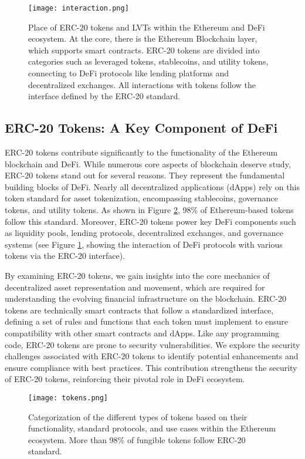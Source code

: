 \begin{figure}[t]
	\centering
	\texttt{[image: interaction.png]}
	\caption{Place of ERC-20 tokens and LVTs within the Ethereum and DeFi ecosystem. At the core, there is the Ethereum Blockchain layer, which supports smart contracts. ERC-20 tokens are divided into categories such as leveraged tokens, stablecoins, and utility tokens, connecting to DeFi protocols like lending platforms and decentralized exchanges. All interactions with tokens follow the interface defined by the ERC-20 standard.}
	\label{fig:interaction}
\end{figure}

\subsection*{ERC-20 Tokens: A Key Component of DeFi}
ERC-20 tokens contribute significantly to the functionality of the Ethereum blockchain and DeFi. While numerous core aspects of blockchain deserve study, ERC-20 tokens stand out for several reasons. They represent the fundamental building blocks of DeFi. Nearly all decentralized applications (dApps) rely on this token standard for asset tokenization, encompassing stablecoins, governance tokens, and utility tokens. As shown in Figure \ref{fig:tokens}, 98\% of Ethereum-based tokens follow this standard. Moreover, ERC-20 tokens power key DeFi components such as liquidity pools, lending protocols, decentralized exchanges, and governance systems (see Figure \ref{fig:interaction}, showing the interaction of DeFi protocols with various tokens via the ERC-20 interface). 

By examining ERC-20 tokens, we gain insights into the core mechanics of decentralized asset representation and movement, which are required for understanding the evolving financial infrastructure on the blockchain. ERC-20 tokens are technically smart contracts that follow a standardized interface, defining a set of rules and functions that each token must implement to ensure compatibility with other smart contracts and dApps. Like any programming code, ERC-20 tokens are prone to security vulnerabilities. We explore the security challenges associated with ERC-20 tokens to identify potential enhancements and ensure compliance with best practices. This contribution strengthens the security of ERC-20 tokens, reinforcing their pivotal role in DeFi ecosystem.

\begin{figure}[t]
	\centering
	\texttt{[image: tokens.png]}
	\caption{Categorization of the different types of tokens based on their functionality, standard protocols, and use cases within the Ethereum ecosystem. More than 98\% of fungible tokens follow ERC-20 standard.}
	\label{fig:tokens}
\end{figure}

